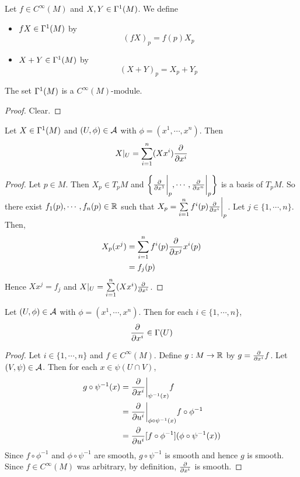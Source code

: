\documentclass{book}
\begin{document}
	\begin{defn}
	Let $f \in C^{\infty}(M)$ and $X,Y \in \Gamma^1(M)$. We define 
	\begin{itemize}
	\item $fX \in \Gamma^1(M)$ by $$(fX)_p = f(p)X_p$$
	\item $X+Y \in \Gamma^1(M)$ by $$(X+Y)_p = X_p+Y_p$$
	\end{itemize}
	\end{defn}
	
	\begin{ex}
	The set $\Gamma^1(M)$ is a $C^{\infty}(M)$-module.
	\end{ex}
	
	\begin{proof}
	Clear.
	\end{proof}

	\begin{ex}
		Let $X \in \Gamma^1(M)$ and $(U, \phi) \in \mathcal{A}$ with $\phi = (x^1, \cdots, x^n)$. Then $$X|_U = \sum_{i=1}^n (Xx^i)\frac{\partial}{\partial x^i}$$ 
	\end{ex}

	\begin{proof}
		Let $p \in M$. Then $X_p \in T_pM$ and $\bigg \{ \frac{\partial}{\partial x^1} \bigg|_p, \cdots, \frac{\partial}{\partial x^n} \bigg|_p \bigg \}$ is a basis of $T_pM$. So there exist $f_1(p), \cdots, f_n(p) \in \mathbb{R}$ such that $X_p = \sum\limits_{i=1}^n f^i(p) \frac{\partial}{\partial x^i} \bigg |_p $. Let $j \in \{1, \cdots, n\}$. Then,
		\begin{align*}
			X_p(x^j) 
			&= \sum\limits_{i=1}^n f^i(p) {\frac{\partial}{\partial x^j}{x^i}}(p) \\
			&= f_j(p) \\
		\end{align*} 
		Hence $Xx^j = f_j$ and $X|_U = \sum\limits_{i=1}^n (Xx^i)\frac{\partial}{\partial x^i}$.
	\end{proof}
	
	\begin{ex}
	Let $(U, \phi) \in \mathcal{A}$ with $\phi = (x^1, \cdots, x^n)$. Then for each $i \in \{1, \cdots, n\}$, $$\frac{\partial}{\partial x^i} \in \Gamma(U)$$
	\end{ex}
	
	\begin{proof}
	Let $i \in \{1, \cdots, n\}$ and $f \in C^{\infty}(M)$. Define $g: M \rightarrow \mathbb{R}$ by $g =\frac{\partial}{\partial x^i} f$. Let $(V, \psi) \in \mathcal{A}$. Then for each $x \in \psi(U \cap V)$, 
	\begin{align*}
	g \circ \psi^{-1}(x) 
	&= \frac{\partial}{\partial x^i} \bigg|_{\psi^{-1}(x)}f \\
	&= \frac{\partial}{\partial u^i} \bigg|_{\phi \circ \psi^{-1}(x)}f \circ \phi^{-1}  \\
	&= \frac{\partial}{\partial u^i}[f \circ \phi^{-1}] ( \phi \circ \psi^{-1} (x))\\
\end{align*}	 
	Since $f \circ \phi^{-1}$ and $\phi \circ \psi^{-1}$ are smooth, $g \circ \psi^{-1}$ is smooth and hence $g$ is smooth. Since $f \in C^{\infty}(M)$ was arbitrary, by definition, $\frac{\partial}{\partial x^i}$ is smooth. 
	\end{proof}
	
\end{document}
